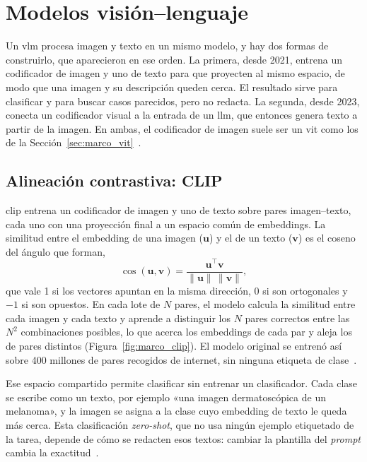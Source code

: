 \section{Modelos visión--lenguaje}
\label{sec:marco_vlm}

Un \gls{vlm} procesa imagen y texto en un mismo modelo, y hay dos formas de construirlo, que aparecieron en
ese orden. La primera, desde 2021, entrena un codificador de imagen y uno de texto para que proyecten al mismo
espacio, de modo que una imagen y su descripción queden cerca. El resultado sirve para clasificar y para
buscar casos parecidos, pero no redacta. La segunda, desde 2023, conecta un codificador visual a la entrada de
un \gls{llm}, que entonces genera texto a partir de la imagen. En ambas, el codificador de imagen suele ser un
\gls{vit} como los de la Sección~\ref{sec:marco_vit}~\cite{radford2021learning,liu2023visual}.

\subsection{Alineación contrastiva: CLIP}
\label{sec:marco_vlm_clip}

\Gls{clip} entrena un codificador de imagen y uno de texto sobre pares imagen--texto, cada uno con una
proyección final a un espacio común de embeddings. La similitud entre el embedding de una imagen ($\mathbf{u}$)
y el de un texto ($\mathbf{v}$) es el coseno del ángulo que forman,
\begin{equation}
    \cos(\mathbf{u}, \mathbf{v}) = \frac{\mathbf{u}^{\top}\mathbf{v}}{\lVert\mathbf{u}\rVert\,\lVert\mathbf{v}\rVert},
    \label{eq:marco_cos}
\end{equation}
que vale 1 si los vectores apuntan en la misma dirección, 0 si son ortogonales y $-1$ si son opuestos. En cada
lote de $N$ pares, el modelo calcula la similitud entre cada imagen y cada texto y aprende a distinguir los $N$
pares correctos entre las $N^2$ combinaciones posibles, lo que acerca los embeddings de cada par y aleja los de
pares distintos (Figura~\ref{fig:marco_clip}). El modelo original se entrenó así sobre 400 millones de pares
recogidos de internet, sin ninguna etiqueta de clase~\cite{radford2021learning}.



Ese espacio compartido permite clasificar sin entrenar un clasificador. Cada clase se escribe como un
texto, por ejemplo «una imagen dermatoscópica de un melanoma», y la imagen se asigna a la clase cuyo
embedding de texto le queda más cerca. Esta clasificación \emph{zero-shot}, que no usa ningún ejemplo
etiquetado de la tarea, depende de cómo se redacten esos textos: cambiar la plantilla del \emph{prompt}
cambia la exactitud~\cite{radford2021learning}.

